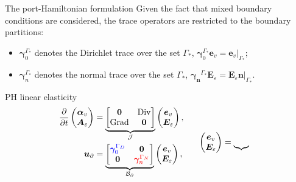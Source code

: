 \documentclass[aspectratio=169]{ISAE-Beamer}
\DeclareMathOperator*{\Grad}{Grad}
\DeclareMathOperator*{\Div}{Div}
\begin{document}
\begin{frame}{The port-Hamiltonian formulation}
	Given the fact that mixed boundary conditions are considered, the trace operators are restricted to the boundary partitions:
	\begin{itemize} 
		\item $\bm\gamma_{0}^{\Gamma_*}$ denotes the Dirichlet trace over the set $\Gamma_*$, $\bm\gamma_{0}^{\Gamma_*} \bm{e}_v = \bm{e}_v\vert_{\Gamma_*}$;
		\item $\bm\gamma_{n}^{\Gamma_*}$ denotes the normal trace over the set $\Gamma_*$, $\bm{\gamma_{n}}^{\Gamma_*}\bm{E}_\varepsilon = \bm{E}_\varepsilon \bm{n}\vert_{\Gamma_*}$.
	\end{itemize}

	\begin{block}{PH linear elasticity}
	\begin{equation*}
	\begin{aligned}
	\displaystyle
	\diffp{}{t}
	\begin{pmatrix}
	\bm{\alpha}_v \\
	\bm{A}_\varepsilon
	\end{pmatrix} &= \underbrace{
		\begin{bmatrix}
		\bm{0} & \Div \\
		\Grad & \bm{0} \\
		\end{bmatrix}}_{\mathcal{J}}
	\begin{pmatrix}
	\bm{e}_v \\
	\bm{E}_\varepsilon
	\end{pmatrix}, \\
	\bm{u}_\partial &= \underbrace{
		\begin{bmatrix}
		\textcolor{blue}{\bm\gamma_{0}^{\Gamma_D}} & \bm{0} \\
		\bm{0} & \textcolor{red}{\bm\gamma_n^{\Gamma_N}} \\
		\end{bmatrix}}_{\mathcal{B}_\partial} \begin{pmatrix}
	\bm{e}_v \\
	\bm{E}_\varepsilon
	\end{pmatrix}, \vspace{3pt}\qquad
	\end{aligned}
	\begin{aligned}
	\begin{pmatrix}
	\bm{e}_v \\
	\bm{E}_\varepsilon
	\end{pmatrix} &= 
	\underbrace{
}
\end{aligned}
\end{equation*}
\end{block}
\end{frame}
\end{document}
